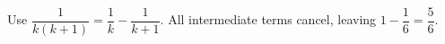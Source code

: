 Use $\dfrac{1}{k(k+1)}=\dfrac{1}{k}-\dfrac{1}{k+1}$. All intermediate terms cancel, leaving $\boxed{1-\dfrac{1}{6}=\dfrac{5}{6}}$.
